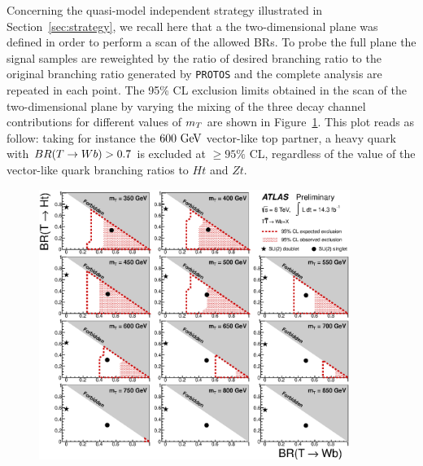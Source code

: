 Concerning the quasi-model independent strategy illustrated in Section~\ref{sec:strategy}, 
we recall here that a the two-dimensional plane was defined in order
to perform a scan of the allowed BRs.
To probe the full plane the signal samples are reweighted by the ratio
of desired branching ratio to the original branching ratio generated
by \texttt{PROTOS} and the complete analysis are repeated in each point.
The  95\% CL exclusion limits  obtained in the scan of the two-dimensional
plane by varying the mixing of the three decay channel contributions for
different values of $m_{\T}$ are shown in Figure~\ref{fig:limits2D_wbx}. 
This plot reads as follow: taking for instance the $600\gev$ 
vector-like top partner, a heavy quark with
$BR(\T\to W b)>0.7$ is excluded at $\geq 95\%$ CL, 
regardless of the value of the vector-like quark branching ratios to $Ht$ and $Zt$.  

\begin{figure}[h!bt]
\begin{center}
\includegraphics[width=0.9\textwidth]{results/figures/NewttbarMod/lim_Scan2D_tight_Bin1.eps}
\caption[bla]{
\label{fig:limits2D_wbx}}
\end{center}
\end{figure}

